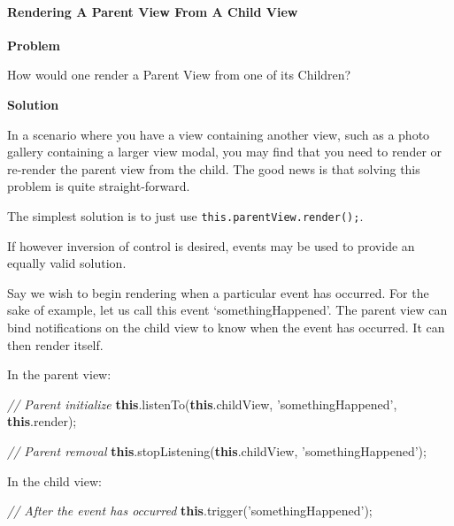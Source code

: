 \documentclass[9pt]{book}
\newenvironment{Shaded}{}{}
\newcommand{\KeywordTok}[1]{\textcolor[rgb]{0.00,0.44,0.13}{\textbf{{#1}}}}
\newcommand{\StringTok}[1]{\textcolor[rgb]{0.25,0.44,0.63}{{#1}}}
\newcommand{\CommentTok}[1]{\textcolor[rgb]{0.38,0.63,0.69}{\textit{{#1}}}}
\newcommand{\FunctionTok}[1]{\textcolor[rgb]{0.02,0.16,0.49}{{#1}}}
\newcommand{\NormalTok}[1]{{#1}}
\begin{document}
\paragraph{Rendering A Parent View From A Child
View}\label{rendering-a-parent-view-from-a-child-view}

\textbf{Problem}

How would one render a Parent View from one of its Children?

\textbf{Solution}

In a scenario where you have a view containing another view, such as a
photo gallery containing a larger view modal, you may find that you need
to render or re-render the parent view from the child. The good news is
that solving this problem is quite straight-forward.

The simplest solution is to just use \texttt{this.parentView.render();}.

If however inversion of control is desired, events may be used to
provide an equally valid solution.

Say we wish to begin rendering when a particular event has occurred. For
the sake of example, let us call this event `somethingHappened'. The
parent view can bind notifications on the child view to know when the
event has occurred. It can then render itself.

In the parent view:

\begin{Shaded}
\begin{Highlighting}[]
\CommentTok{// Parent initialize}
\KeywordTok{this}\NormalTok{.}\FunctionTok{listenTo}\NormalTok{(}\KeywordTok{this}\NormalTok{.}\FunctionTok{childView}\NormalTok{, }\StringTok{'somethingHappened'}\NormalTok{, }\KeywordTok{this}\NormalTok{.}\FunctionTok{render}\NormalTok{);}

\CommentTok{// Parent removal}
\KeywordTok{this}\NormalTok{.}\FunctionTok{stopListening}\NormalTok{(}\KeywordTok{this}\NormalTok{.}\FunctionTok{childView}\NormalTok{, }\StringTok{'somethingHappened'}\NormalTok{);}
\end{Highlighting}
\end{Shaded}

In the child view:

\begin{Shaded}
\begin{Highlighting}[]

\CommentTok{// After the event has occurred}
\KeywordTok{this}\NormalTok{.}\FunctionTok{trigger}\NormalTok{(}\StringTok{'somethingHappened'}\NormalTok{);}
\end{Highlighting}
\end{Shaded}
\end{document}
